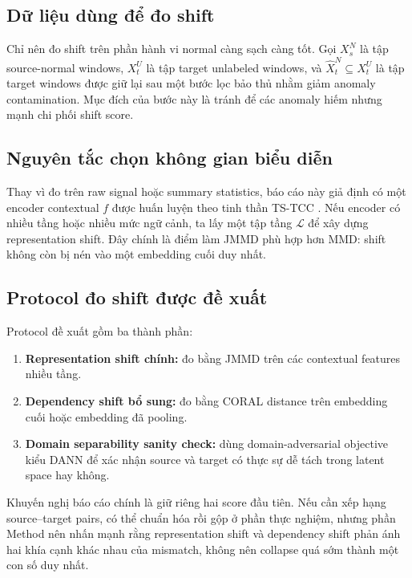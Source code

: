 \documentclass[a4paper]{article}
\begin{document}
\subsection{Dữ liệu dùng để đo shift}

Chỉ nên đo shift trên phần hành vi normal càng sạch càng tốt. Gọi \(X_s^N\) là tập source-normal windows, \(X_t^U\) là tập target unlabeled windows, và \(\widehat{X}_t^N \subseteq X_t^U\) là tập target windows được giữ lại sau một bước lọc bảo thủ nhằm giảm anomaly contamination. Mục đích của bước này là tránh để các anomaly hiếm nhưng mạnh chi phối shift score.

\subsection{Nguyên tắc chọn không gian biểu diễn}

Thay vì đo trên raw signal hoặc summary statistics, báo cáo này giả định có một encoder contextual \(f\) được huấn luyện theo tinh thần TS-TCC \cite{tstcc}. Nếu encoder có nhiều tầng hoặc nhiều mức ngữ cảnh, ta lấy một tập tầng \(\mathcal{L}\) để xây dựng representation shift. Đây chính là điểm làm JMMD phù hợp hơn MMD: shift không còn bị nén vào một embedding cuối duy nhất.

\subsection{Protocol đo shift được đề xuất}

Protocol đề xuất gồm ba thành phần:
\begin{enumerate}[label=\arabic*.]
    \item \textbf{Representation shift chính:} đo bằng JMMD trên các contextual features nhiều tầng.
    \item \textbf{Dependency shift bổ sung:} đo bằng CORAL distance trên embedding cuối hoặc embedding đã pooling.
    \item \textbf{Domain separability sanity check:} dùng domain-adversarial objective kiểu DANN để xác nhận source và target có thực sự dễ tách trong latent space hay không.
\end{enumerate}

Khuyến nghị báo cáo chính là giữ riêng hai score đầu tiên. Nếu cần xếp hạng source--target pairs, có thể chuẩn hóa rồi gộp ở phần thực nghiệm, nhưng phần Method nên nhấn mạnh rằng representation shift và dependency shift phản ánh hai khía cạnh khác nhau của mismatch, không nên collapse quá sớm thành một con số duy nhất.
\end{document}
